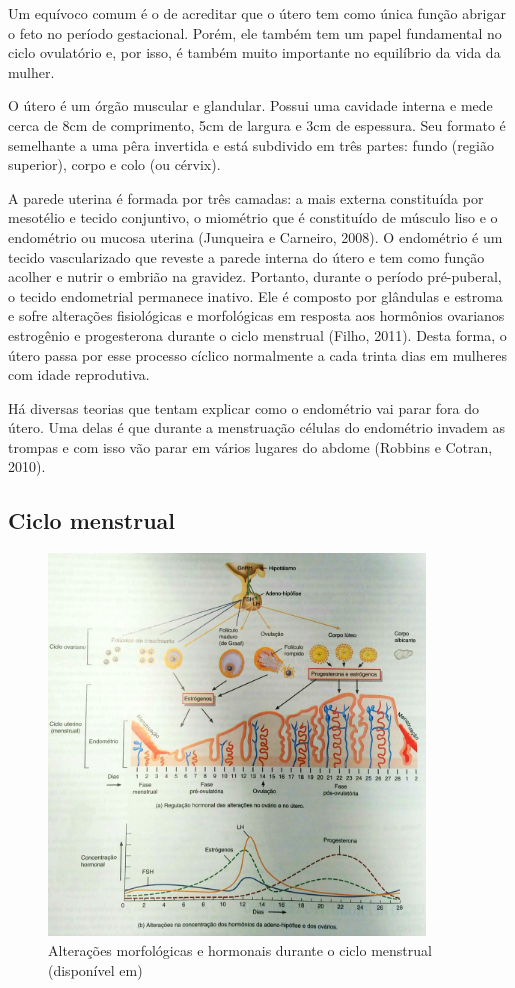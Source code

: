 \documentclass[12pt]{article} %
\begin{document}
Um equívoco comum é o de acreditar que o útero tem como única função
abrigar o feto no período gestacional. Porém, ele também tem um papel
fundamental no ciclo ovulatório e, por isso, é também muito importante
no equilíbrio da vida da mulher.

O útero é um órgão muscular e glandular. Possui uma cavidade interna e
mede cerca de 8cm de comprimento, 5cm de largura e 3cm de
espessura. Seu formato é semelhante a uma pêra invertida e está
subdivido em três partes: fundo (região superior), corpo e colo (ou cérvix).

A parede uterina é formada por três camadas: a mais externa
constituída por mesotélio e tecido conjuntivo, o miométrio que é
constituído de músculo liso e o endométrio ou mucosa uterina
(Junqueira e Carneiro, 2008). O endométrio é um tecido vascularizado que
reveste a parede interna do útero e tem como função acolher e nutrir o
embrião na gravidez. Portanto, durante o período pré-puberal, o
tecido endometrial permanece inativo. Ele é composto por glândulas e
estroma e sofre alterações fisiológicas e morfológicas em resposta aos
hormônios ovarianos estrogênio e progesterona durante o ciclo
menstrual (Filho, 2011).  Desta forma, o útero passa por esse processo
cíclico normalmente a cada trinta dias em mulheres com idade
reprodutiva.

Há diversas teorias que tentam explicar como o endométrio vai parar
fora do útero. Uma delas é que durante a menstruação células do
endométrio invadem as trompas e com isso vão parar em vários lugares
do abdome (Robbins e Cotran, 2010).

\subsection{Ciclo menstrual}

\begin{figure}[h!]
\centering
\includegraphics[width=10cm]{ciclo.jpg}
\caption[Alterações morfológicas e hormonais durante o ciclo menstrual]{ Alterações morfológicas e hormonais durante o ciclo menstrual (disponível em) } 
\label{ciclo menstrual}
\end{figure} 
\end{document}
